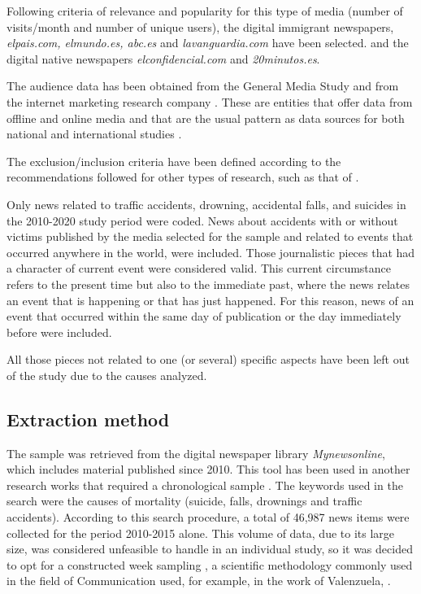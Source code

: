 Following criteria of relevance and popularity for this type of media
(number of visits/month and number of unique users), the digital
immigrant newspapers, \emph{elpais.com, elmundo.es, abc.es} and
\emph{lavanguardia.com} have been selected. and the digital native
newspapers \emph{elconfidencial.com} and \emph{20minutos.es}.

The audience data has been obtained from the General Media Study
\cite{boasberg2019marco} and from the internet
marketing research company \textcite{comscore2017rating}. These are entities that
offer data from offline and online media and that are the usual pattern
as data sources for both national \cite{galletero2018estudio} and international studies \cite{potvin2018frequency}.

The exclusion/inclusion criteria have been defined according to the
recommendations followed for other types of research, such as that of
\textcite{zimmermann2019content}.

Only news related to traffic accidents, drowning, accidental falls, and
suicides in the 2010-2020 study period were coded. News about accidents
with or without victims published by the media selected for the sample
and related to events that occurred anywhere in the world, were
included. Those journalistic pieces that had a character of current
event were considered valid. This current circumstance refers to the
present time but also to the immediate past, where the news relates an
event that is happening or that has just happened. For this reason, news
of an event that occurred within the same day of publication or the day
immediately before were included.

All those pieces not related to one (or several) specific aspects have
been left out of the study due to the causes analyzed.

\subsection{Extraction method}\label{sub-sec-extractionmethod}

The sample was retrieved from the digital newspaper library
\emph{Mynewsonline}, which includes material published since 2010. This
tool has been used in another research works that required a
chronological sample \cite{repiso2018universidades,garcia2018quality}. The keywords used in the search were the causes
of mortality (suicide, falls, drownings and traffic accidents).
According to this search procedure, a total of 46,987 news items were
collected for the period 2010-2015 alone. This volume of data, due to
its large size, was considered unfeasible to handle in an individual
study, so it was decided to opt for a constructed week sampling \cite{hester2007efficiency}, a scientific methodology commonly used in the field
of Communication used, for example, in the work of Valenzuela, \cite{valenzuela2017behavioral}.

